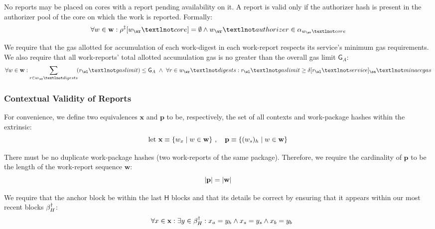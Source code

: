 No reports may be placed on cores with a report pending availability on it. A report is valid only if the authorizer hash is present in the authorizer pool of the core on which the work is reported. Formally:
\begin{equation}\label{eq:reportcoresareunusedortimedout}
  \forall w \in \mathbf{w} :
    \reportspostguarantees[w_\wr¬core] = \none \wedge w_\wr¬authorizer \in \authpool_{w_\wr¬core}
\end{equation}

We require that the gas allotted for accumulation of each work-digest in each work-report respects its service's minimum gas requirements. We also require that all work-reports' total allotted accumulation gas is no greater than the overall gas limit $\mathsf{G}_A$:
\begin{equation}
  \forall w \in \mathbf{w}:
    \sum_{r \in w_\wr¬digests}\!(r_\wl¬gaslimit) \le \mathsf{G}_A \ \wedge \ 
    \forall r \in w_\wr¬digests: r_\wl¬gaslimit \ge \accounts[r_\wl¬service]_\sa¬minaccgas
\end{equation}












\subsubsection{Contextual Validity of Reports}\label{sec:contextualvalidity}

For convenience, we define two equivalences $\mathbf{x}$ and $\mathbf{p}$ to be, respectively, the set of all contexts and work-package hashes within the extrinsic:
\begin{equation}
    \text{let } \mathbf{x} \equiv \{ w_x \mid w \in \mathbf{w} \}\ ,\quad
    \mathbf{p} \equiv \{ (w_s)_h \mid w \in \mathbf{w} \}
\end{equation}

There must be no duplicate work-package hashes (\ie two work-reports of the same package). Therefore, we require the cardinality of $\mathbf{p}$ to be the length of the work-report sequence $\mathbf{w}$:
\begin{equation}
  \len{\mathbf{p}} = \len{\mathbf{w}}
\end{equation}

We require that the anchor block be within the last $\mathsf{H}$ blocks and that its details be correct by ensuring that it appears within our most recent blocks $\beta_H^\dagger$:
\begin{align}
  \forall x \in \mathbf{x} : \exists y \in \beta_H^\dagger : x_a = y_h \wedge x_s = y_s \wedge x_b = y_b\!\!\!\!\!\!
\end{align}

